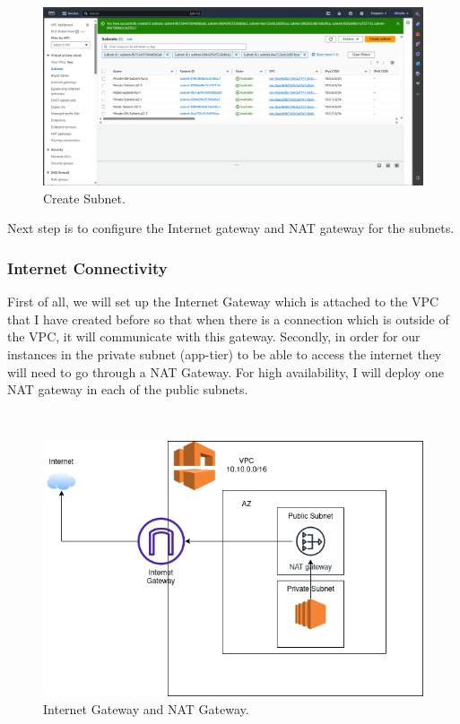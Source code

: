 \documentclass{article}
\begin{document}
\newpage
\begin{figure}[!htp]
    \centering
    \includegraphics[width=12cm]{Pictures/Networking and Security/Subnets_create.png}
    \caption{Create Subnet.}
    \label{fig:enter-label}
\end{figure}

Next step is to configure the Internet gateway and NAT gateway for the subnets.\par
\subsubsection{Internet Connectivity}
First of all, we will set up the Internet Gateway which is attached to the VPC that I have created before so that when there is a connection which is outside of the VPC, it will communicate with this gateway. Secondly, in order for our instances in the private subnet (app-tier) to be able to access the internet they will need to go through a NAT Gateway. For high availability, I will deploy one NAT gateway in each of the public subnets.\par\
\begin{figure}[h]
    \centering
    \includegraphics[width=12cm]{Pictures/Networking and Security/IGW and NAT.png}
    \caption{Internet Gateway and NAT Gateway.}
    \label{fig:enter-label}
\end{figure}
\end{document}
